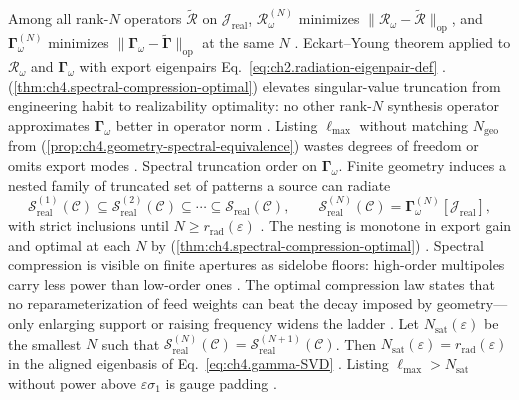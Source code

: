 \label{thm:ch4.spectral-compression-optimal}
Among all rank-\(N\) operators \(\widetilde{\mathcal{R}}\) on \(\mathcal{J}_{\mathrm{real}}\),
\(\mathcal{R}_\omega^{(N)}\) minimizes \(\|\mathcal{R}_\omega-\widetilde{\mathcal{R}}\|_{\mathrm{op}}\), and
\(\boldsymbol{\Gamma}_\omega^{(N)}\) minimizes \(\|\boldsymbol{\Gamma}_\omega-\widetilde{\boldsymbol{\Gamma}}\|_{\mathrm{op}}\)
at the same \(N\) \cite{harrington2001}.
Eckart--Young theorem applied to \(\mathcal{R}_\omega\) and \(\boldsymbol{\Gamma}_\omega\) with export eigenpairs
Eq.~\eqref{eq:ch2.radiation-eigenpair-def} \cite{stratton1941}.
(\ref{thm:ch4.spectral-compression-optimal}) elevates singular-value truncation from engineering habit to
realizability optimality: no other rank-\(N\) synthesis operator approximates \(\boldsymbol{\Gamma}_\omega\) better in
operator norm \cite{hansen1988}. Listing \(\ell_{\max}\) without matching \(N_{\mathrm{geo}}\) from
(\ref{prop:ch4.geometry-spectral-equivalence}) wastes degrees of freedom or omits export modes
\cite{devaney2004}.
Spectral truncation order on \(\boldsymbol{\Gamma}_\omega\). Finite geometry induces a nested family of truncated set of patterns a source can radiate
\begin{equation}
\label{eq:ch4.compression-hierarchy}
\mathcal{S}_{\mathrm{real}}^{(1)}(\mathcal{C})
\subseteq
\mathcal{S}_{\mathrm{real}}^{(2)}(\mathcal{C})
\subseteq
\cdots
\subseteq
\mathcal{S}_{\mathrm{real}}(\mathcal{C}),
\qquad
\mathcal{S}_{\mathrm{real}}^{(N)}(\mathcal{C})
=
\boldsymbol{\Gamma}_\omega^{(N)}[\mathcal{J}_{\mathrm{real}}],
\end{equation}
with strict inclusions until \(N\ge r_{\mathrm{rad}}(\varepsilon)\) \cite{stratton1941}. The
nesting is monotone in export gain and optimal at each \(N\) by (\ref{thm:ch4.spectral-compression-optimal})
\cite{hansen1988}.
Spectral compression is visible on finite apertures as sidelobe floors: high-order multipoles carry less power than low-order ones \cite{hansen1988}. The optimal compression law states that no reparameterization of feed weights can beat the decay imposed by geometry---only enlarging support or raising frequency widens the ladder \cite{chu1948}.
\label{cor:ch4.compression-saturation}
Let \(N_{\mathrm{sat}}(\varepsilon)\) be the smallest \(N\) such that
\(\mathcal{S}_{\mathrm{real}}^{(N)}(\mathcal{C})=\mathcal{S}_{\mathrm{real}}^{(N+1)}(\mathcal{C})\). Then
\(N_{\mathrm{sat}}(\varepsilon)=r_{\mathrm{rad}}(\varepsilon)\) in the aligned eigenbasis of
Eq.~\eqref{eq:ch4.gamma-SVD} \cite{harrington2001}. Listing \(\ell_{\max}>N_{\mathrm{sat}}\)
without power above \(\varepsilon\sigma_{1}\) is gauge padding \cite{hansen1988}.
